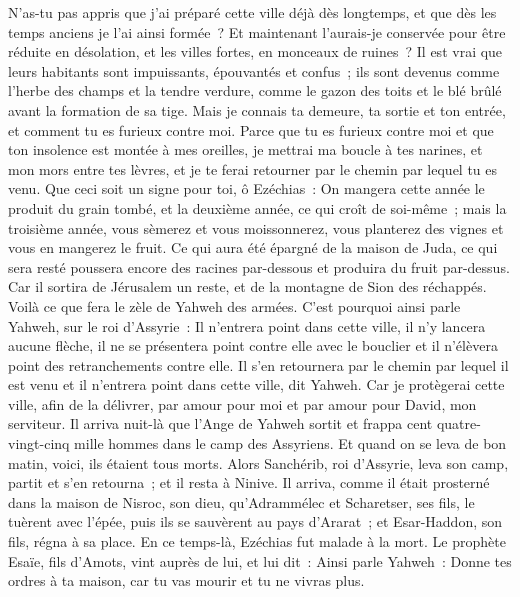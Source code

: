 \begin{multicols}{2}
N'as-tu pas appris que j'ai préparé cette ville déjà dès longtemps, et que dès les temps anciens je l'ai ainsi formée~? Et maintenant l'aurais-je conservée pour être réduite en désolation, et les villes fortes, en monceaux de ruines~?
Il est vrai que leurs habitants sont impuissants, épouvantés et confus~; ils sont devenus comme l'herbe des champs et la tendre verdure, comme le gazon des toits et le blé brûlé avant la formation de sa tige.
Mais je connais ta demeure, ta sortie et ton entrée, et comment tu es furieux contre moi.
Parce que tu es furieux contre moi et que ton insolence est montée à mes oreilles, je mettrai ma boucle à tes narines, et mon mors entre tes lèvres, et je te ferai retourner par le chemin par lequel tu es venu.
Que ceci soit un signe pour toi, ô Ezéchias~: On mangera cette année le produit du grain tombé, et la deuxième année, ce qui croît de soi-même~; mais la troisième année, vous sèmerez et vous moissonnerez, vous planterez des vignes et vous en mangerez le fruit.
Ce qui aura été épargné de la maison de Juda, ce qui sera resté poussera encore des racines par-dessous et produira du fruit par-dessus.
Car il sortira de Jérusalem un reste, et de la montagne de Sion des réchappés. Voilà ce que fera le zèle de Yahweh des armées.
C'est pourquoi ainsi parle Yahweh, sur le roi d'Assyrie~: Il n'entrera point dans cette ville, il n'y lancera aucune flèche, il ne se présentera point contre elle avec le bouclier et il n'élèvera point des retranchements contre elle.
Il s'en retournera par le chemin par lequel il est venu et il n'entrera point dans cette ville, dit Yahweh.
Car je protègerai cette ville, afin de la délivrer, par amour pour moi et par amour pour David, mon serviteur.
Il arriva nuit-là que l'Ange de Yahweh sortit et frappa cent quatre-vingt-cinq mille hommes dans le camp des Assyriens. Et quand on se leva de bon matin, voici, ils étaient tous morts.
Alors Sanchérib, roi d'Assyrie, leva son camp, partit et s'en retourna~; et il resta à Ninive.
Il arriva, comme il était prosterné dans la maison de Nisroc, son dieu, qu'Adrammélec et Scharetser, ses fils, le tuèrent avec l'épée, puis ils se sauvèrent au pays d'Ararat~; et Esar-Haddon, son fils, régna à sa place.
\VerseOne{}En ce temps-là, Ezéchias fut malade à la mort. Le prophète Esaïe, fils d'Amots, vint auprès de lui, et lui dit~: Ainsi parle Yahweh~: Donne tes ordres à ta maison, car tu vas mourir et tu ne vivras plus.

\end{multicols}
